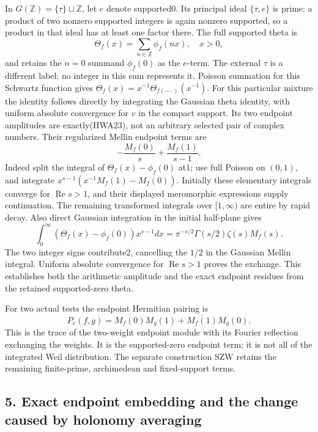 \documentclass[
  10pt,
  a4paper,
]{article}
\begin{document}
In \(G(\mathbb Z)=\{\tau\}\sqcup\mathbb Z\), let \(e\) denote
supported0. Its principal ideal \(\{\tau,e\}\) is prime: a product of
two nonzero supported integers is again nonzero supported, so a product
in that ideal has at least one factor there. The full supported theta is
\[
\Theta_f(x)=\sum_{n\in\mathbb Z}\phi_f(nx),\quad x>0,
\tag{HWA24}
\] and retains the \(n=0\) summand \(\phi_f(0)\) as the \(e\)-term. The
external \(\tau\) is a different label; no integer in this sum
represents it. Poisson summation for this Schwartz function gives
\(\Theta_f(x)=x^{-1}\Theta_{f(-\cdot)}(x^{-1})\). For this particular
mixture the identity follows directly by integrating the Gaussian theta
identity, with uniform absolute convergence for \(v\) in the compact
support. Its two endpoint amplitudes are exactly(HWA23), not an
arbitrary selected pair of complex numbers. Their regularized Mellin
endpoint terms are \[
-\frac{M_f(0)}s+\frac{M_f(1)}{s-1}.
\tag{HWA25}
\] Indeed split the integral of \(\Theta_f(x)-\phi_f(0)\) at1; use full
Poisson on \((0,1)\), and integrate \(x^{s-1}(x^{-1}M_f(1)-M_f(0))\).
Initially these elementary integrals converge for
\(\operatorname{Re}s>1\), and their displayed meromorphic expressions
supply continuation. The remaining transformed integrals over
\([1,\infty)\) are entire by rapid decay. Also direct Gaussian
integration in the initial half-plane gives \[
\int_0^\infty (\Theta_f(x)-\phi_f(0))x^{s-1}dx
=\pi^{-s/2}\Gamma(s/2)\zeta(s)M_f(s).
\tag{HWA26}
\] The two integer signs contribute2, cancelling the \(1/2\) in the
Gaussian Mellin integral. Uniform absolute convergence for
\(\operatorname{Re}s>1\) proves the exchange. This establishes both the
arithmetic amplitude and the exact endpoint residues from the retained
supported-zero theta.

For two actual tests the endpoint Hermitian pairing is \[
P_e(f,g)=\overline{M_f(0)}M_g(1)+\overline{M_f(1)}M_g(0).
\tag{HWA27}
\] This is the trace of the two-weight endpoint module with its Fourier
reflection exchanging the weights. It is the supported-zero endpoint
term; it is not all of the integrated Weil distribution. The separate
construction SZW retains the remaining finite-prime, archimedean and
fixed-support terms.

\subsection{5. Exact endpoint embedding and the change caused by
holonomy
averaging}\label{exact-endpoint-embedding-and-the-change-caused-by-holonomy-averaging}
\end{document}
